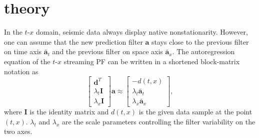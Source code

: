 \section{theory}
In the $t$-$x$ domain, seismic data always display native
nonstationarity. However, one can assume that the new prediction
filter $\mathbf{a}$ stays close to the previous filter on time axis
$\bar{\mathbf{a}}_t$ and the previous filter on space axis
$\bar{\mathbf{a}}_x$. The autoregression equation of the $t$-$x$
streaming PF can be written in a shortened block-matrix notation
\cite[]{Fomel16} as
\begin{equation}
  \label{eq:a}
\left[ \begin{array}{c}
\mathbf{d}^T\\
\lambda_t \mathbf{I}\\
\lambda_x \mathbf{I}
\end{array}\right]
\mathbf{a} \approx
\left[ \begin{array}{c}
-d(t,x)\\
\lambda_t \mathbf{\bar{a}}_t\\
\lambda_x \mathbf{\bar{a}}_x
\end{array}\right],
\end{equation}
where $\mathbf{I}$ is the identity matrix and $d(t,x)$ is the given
data sample at the point $(t,x)$. $\lambda_t$ and $\lambda_x$
are the scale parameters controlling the filter variability on the two
axes.

